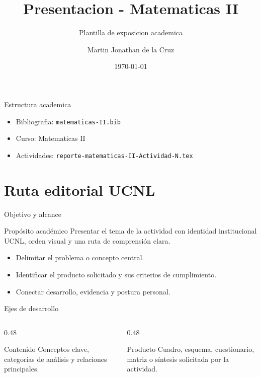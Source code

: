 ﻿\documentclass[spanish,aspectratio=169]{beamer}
\title{Presentacion - Matematicas II}
\subtitle{Plantilla de exposicion academica}
\author{Martin Jonathan de la Cruz}
\institute{Universidad Ciudadana de Nuevo Leon}
\date{\today}
\begin{document}
\begin{frame}
  \titlepage
\end{frame}

\begin{frame}{Estructura academica}
  \begin{itemize}
    \item Bibliografia: \texttt{matematicas-II.bib}
    \item Curso: Matematicas II
    \item Actividades: \texttt{reporte-matematicas-II-Actividad-N.tex}
  \end{itemize}
\end{frame}


\section{Ruta editorial UCNL}

\begin{frame}{Objetivo y alcance}
  \begin{block}{Propósito académico}
    Presentar el tema de la actividad con identidad institucional UCNL, orden visual y una ruta de comprensión clara.
  \end{block}
  \begin{itemize}
    \item Delimitar el problema o concepto central.
    \item Identificar el producto solicitado y sus criterios de cumplimiento.
    \item Conectar desarrollo, evidencia y postura personal.
  \end{itemize}
\end{frame}

\begin{frame}{Ejes de desarrollo}
  \begin{columns}[T,totalwidth=\textwidth]
    \begin{column}{0.48\textwidth}
      \begin{block}{Contenido}
        Conceptos clave, categorías de análisis y relaciones principales.
      \end{block}
    \end{column}
    \begin{column}{0.48\textwidth}
      \begin{block}{Producto}
        Cuadro, esquema, cuestionario, matriz o síntesis solicitada por la actividad.
      \end{block}
    \end{column}
  \end{columns}
\end{frame}
\end{document}
